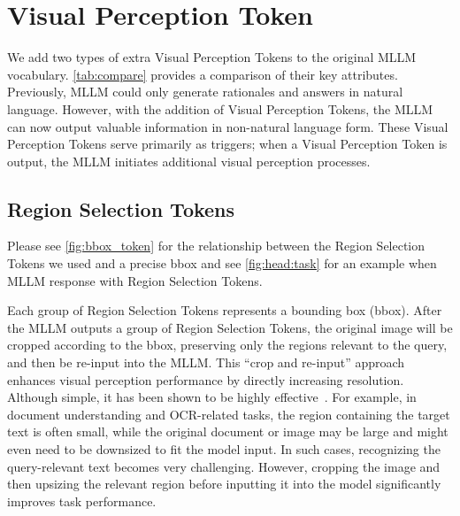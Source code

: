 \section{Visual Perception Token}

We add two types of extra Visual Perception Tokens to the original MLLM vocabulary. \cref{tab:compare} provides a comparison of their key attributes. Previously, MLLM  could only generate rationales and answers in natural language. However, with the addition of Visual Perception Tokens, the MLLM can now output valuable information in non-natural language form. These Visual Perception Tokens serve primarily as triggers; when a Visual Perception Token is output, the MLLM initiates additional visual perception processes.




\subsection{Region Selection Tokens} 
\label{sec:31}

Please see \cref{fig:bbox_token} for the relationship between the Region Selection Tokens we used and a precise bbox and see \cref{fig:head:task} for an example when MLLM response with Region Selection Tokens. 

Each group of Region Selection Tokens represents a bounding box (bbox). After the MLLM outputs a group of Region Selection Tokens, the original image will be cropped according to the bbox, preserving only the regions relevant to the query, and then be re-input into the MLLM. This ``crop and re-input'' approach enhances visual perception performance by directly increasing resolution. Although simple, it has been shown to be highly effective~\cite{llava15,shao2024visual}. For example, in document understanding and OCR-related tasks, the region containing the target text is often small, while the original document or image may be large and might even need to be downsized to fit the model input. In such cases, recognizing the query-relevant text becomes very challenging. However, cropping the image and then upsizing the relevant region before inputting it into the model significantly improves task performance.

